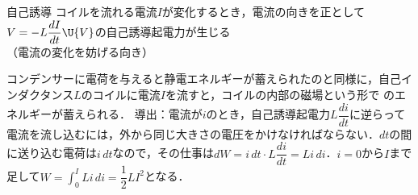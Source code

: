 \bsNeed{26mm}
\begin{matome}{自己誘導}
 \hspace{3mm} コイルを流れる電流$I$が変化するとき，電流の向きを正として$V=-L\dfrac{dI}{dt}\U{V}$の自己誘導起電力が生じる\\
 \hspace{3mm} （電流の変化を妨げる向き）
\end{matome}

コンデンサーに電荷を与えると静電エネルギーが蓄えられたのと同様に，自己インダクタンス$L$のコイルに電流$I$を流すと，コイルの内部の磁場という形で
のエネルギーが蓄えられる．
導出：電流が$i$のとき，自己誘導起電力$L\dfrac{di}{dt}$に逆らって電流を流し込むには，外から同じ大きさの電圧をかけなければならない．$dt$の間に送り込む電荷は$i\,dt$なので，その仕事は$dW=i\,dt\cdot L\dfrac{di}{dt}=Li\,di$．$i=0$から$I$まで足して$W=\displaystyle\int_0^ILi\,di=\dfrac{1}{2}LI^2$となる．

